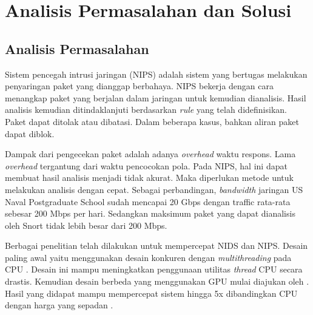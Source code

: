\chapter{Analisis Permasalahan dan Solusi}


  \section{Analisis Permasalahan}
  
    Sistem pencegah intrusi jaringan (NIPS) adalah sistem yang bertugas melakukan penyaringan paket yang dianggap berbahaya. NIPS bekerja dengan cara menangkap paket yang berjalan dalam jaringan untuk kemudian dianalisis. Hasil analisis kemudian ditindaklanjuti berdasarkan \emph{rule} yang telah didefinisikan. Paket dapat ditolak atau dibatasi. Dalam beberapa kasus, bahkan aliran paket dapat diblok.

    Dampak dari pengecekan paket adalah adanya \emph{overhead} waktu respons. Lama \emph{overhead} tergantung dari waktu pencocokan pola. Pada NIPS, hal ini dapat membuat hasil analisis menjadi tidak akurat. Maka diperlukan metode untuk melakukan analisis dengan cepat. Sebagai perbandingan, \emph{bandwidth} jaringan US Naval Postgraduate School sudah mencapai 20 Gbps dengan traffic rata-rata sebesar 200 Mbps per hari. Sedangkan maksimum paket yang dapat dianalisis oleh Snort tidak lebih besar dari 200 Mbps.

    Berbagai penelitian telah dilakukan untuk mempercepat NIDS dan NIPS. Desain paling awal yaitu menggunakan desain konkuren dengan \emph{multithreading} pada CPU \parencite{multi2004}. Desain ini mampu meningkatkan penggunaan utilitas \emph{thread} CPU secara drastis. Kemudian desain berbeda yang menggunakan GPU mulai diajukan oleh \textcite{gnort2008}. Hasil yang didapat mampu mempercepat sistem hingga 5x dibandingkan CPU dengan harga yang sepadan \parencite{smith2009}.



